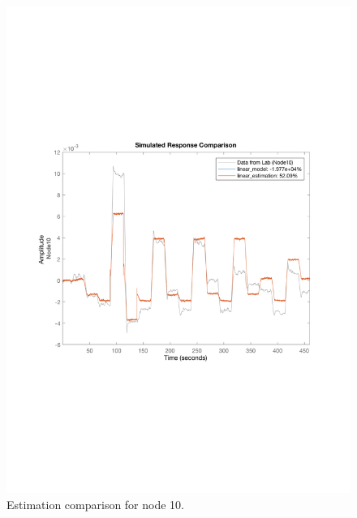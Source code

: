 \begin{figure}[!tbp]
  \centering
  \begin{minipage}[b]{0.45\textwidth}
    \includegraphics[width=\textwidth]{report/pictures/Node10_estimation.pdf}
    \caption{Estimation comparison for node 10.}
  \end{minipage}
  \hfill
  \begin{minipage}[b]{0.45\textwidth}

\end{minipage}
\end{figure}
